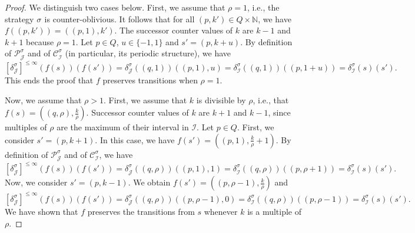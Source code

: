 \documentclass[a4paper,UKenglish,cleveref,autoref,thm-restate,colorlinks]{lipics-v2021}
\newcommand{\IN}{\mathbb{N}}
\newcommand{\mdpTrans}{\delta}
\newcommand{\weightVal}{u}
\newcommand{\ocStateSpace}{Q}
\newcommand{\ocState}{q}
\newcommand{\ocStateB}{p}
\newcommand{\ocCount}{k}
\newcommand{\ocCountB}{k'}
\newcommand{\ocConfig}{s}
\newcommand{\ocTrans}{\delta}
\newcommand{\period}{\rho}
\newcommand{\mchain}{\mathcal{C}}
\newcommand{\ocChain}{\mathcal{P}}
\newcommand{\intPart}{\mathcal{I}}
\newcommand{\intPartB}{\mathcal{J}}
\newcommand{\compressChainStrat}[1]{\mchain^{#1}_{\intPart}}
\newcommand{\compressChain}{\compressChainStrat{\strat}}
\newcommand{\compressChainTransTemplate}[2]{\mdpTrans^{#1}_{#2}}
\newcommand{\compressChainTrans}{\compressChainTransTemplate{\strat}{\intPart}}
\newcommand{\cisChainStrat}[1]{\ocChain^{#1}_{\intPartB}}
\newcommand{\cisChain}{\cisChainStrat{\strat}}
\newcommand{\cisChainTransTemplate}[2]{\ocTrans_{#1}^{#2}}
\newcommand{\cisChainTrans}{\cisChainTransTemplate{\intPartB}{\strat}}
\newcommand{\stratGeneric}[1]{{\sigma_{#1}}}
\newcommand{\strat}{\stratGeneric{}}
\begin{document}
\begin{proof}
  We distinguish two cases below.
  First, we assume that $\period=1$, i.e., the strategy $\strat$ is counter-oblivious.
  It follows that for all $(\ocStateB, \ocCountB)\in\ocStateSpace\times\IN$, we have $f((\ocStateB, \ocCountB)) = ((\ocStateB, 1), \ocCountB)$.
  The successor counter values of $\ocCount$ are $\ocCount-1$ and $\ocCount+1$ because $\period=1$.
  Let $\ocStateB\in\ocStateSpace$, $\weightVal\in\{-1, 1\}$ and $\ocConfig'=(\ocStateB, \ocCount+\weightVal)$.
  By definition of $\cisChain$ and of $\compressChain$ (in particular, its periodic structure), we have
  \[
    [\cisChainTrans]^{\leq\infty}(f(\ocConfig))(f(\ocConfig'))
    = \cisChainTrans((\ocState, 1))((\ocStateB, 1), \weightVal)
    = \compressChainTrans((\ocState, 1))((\ocStateB, 1+\weightVal))
    = \compressChainTrans(\ocConfig)(\ocConfig').
  \]
  This ends the proof that $f$ preserves transitions when $\period=1$.
  
  Now, we assume that $\period > 1$.
  First, we assume that $\ocCount$ is divisible by $\period$, i.e., that $f(\ocConfig) = ((\ocState, \period), \frac{\ocCount}{\period})$.
  Successor counter values of $\ocCount$ are $\ocCount+1$ and $\ocCount-1$, since multiples of $\period$ are the maximum of their interval in $\intPart$.
  Let $\ocStateB\in\ocStateSpace$.
  First, we consider $\ocConfig'=(\ocStateB, \ocCount+1)$.
  In this case, we have $f(\ocConfig') = ((\ocStateB, 1), \frac{\ocCount}{\period}+1)$.
  By definition of $\cisChain$ and of $\compressChain$, we have
  \[
    [\cisChainTrans]^{\leq\infty}(f(\ocConfig))(f(\ocConfig'))
    = \cisChainTrans((\ocState, \period))((\ocStateB, 1), 1)
    = \compressChainTrans((\ocState, \period))((\ocStateB, \period+1))
    = \compressChainTrans(\ocConfig)(\ocConfig').
  \]
  Now, we consider $\ocConfig'=(\ocStateB, \ocCount-1)$.
  We obtain $f(\ocConfig') = ((\ocStateB, \period-1), \frac{\ocCount}{\period})$ and
  \[
    [\cisChainTrans]^{\leq\infty}(f(\ocConfig))(f(\ocConfig'))
    = \cisChainTrans((\ocState, \period))((\ocStateB, \period-1), 0)
    = \compressChainTrans((\ocState, \period))((\ocStateB, \period-1))
    = \compressChainTrans(\ocConfig)(\ocConfig').
  \]
  We have shown that $f$ preserves the transitions from $\ocConfig$ whenever $\ocCount$ is a multiple of $\period$.


\end{proof}
\end{document}
